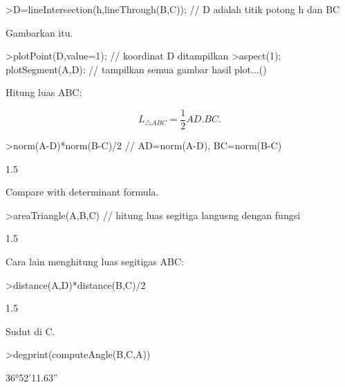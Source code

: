 \documentclass[a4paper,10pt]{article}
\begin{document}
\begin{eulernotebook}
\begin{eulercomment}
\begin{eulercomment}
\begin{eulercomment}
\begin{eulercomment}
\begin{eulercomment}
\begin{eulercomment}
\begin{eulercomment}
\begin{eulercomment}
\begin{eulercomment}
\begin{eulercomment}
\begin{eulercomment}
\begin{eulercomment}
\begin{eulercomment}
\begin{eulercomment}
\begin{eulercomment}
\begin{eulercomment}
\begin{eulercomment}
\begin{eulercomment}
\begin{eulerprompt}
>D=lineIntersection(h,lineThrough(B,C)); // D adalah titik potong h dan BC
\end{eulerprompt}
\begin{eulercomment}
Gambarkan itu.
\end{eulercomment}
\begin{eulerprompt}
>plotPoint(D,value=1); // koordinat D ditampilkan
>aspect(1); plotSegment(A,D): // tampilkan semua gambar hasil plot...()
\end{eulerprompt}
\begin{eulercomment}
Hitung luas ABC:

\end{eulercomment}
\begin{eulerformula}
\[
L_{\triangle ABC}= \frac{1}{2}AD.BC.
\]
\end{eulerformula}
\begin{eulerprompt}
>norm(A-D)*norm(B-C)/2 // AD=norm(A-D), BC=norm(B-C)
\end{eulerprompt}
\begin{euleroutput}
  1.5
\end{euleroutput}
\begin{eulercomment}
Compare with determinant formula.
\end{eulercomment}
\begin{eulerprompt}
>areaTriangle(A,B,C) // hitung luas segitiga langusng dengan fungsi
\end{eulerprompt}
\begin{euleroutput}
  1.5
\end{euleroutput}
\begin{eulercomment}
Cara lain menghitung luas segitigas ABC:
\end{eulercomment}
\begin{eulerprompt}
>distance(A,D)*distance(B,C)/2
\end{eulerprompt}
\begin{euleroutput}
  1.5
\end{euleroutput}
\begin{eulercomment}
Sudut di C.
\end{eulercomment}
\begin{eulerprompt}
>degprint(computeAngle(B,C,A))
\end{eulerprompt}
\begin{euleroutput}
  36°52'11.63''
\end{euleroutput}
\begin{eulercomment}

\end{eulercomment}
\end{eulercomment}
\end{eulercomment}
\end{eulercomment}
\end{eulercomment}
\end{eulercomment}
\end{eulercomment}
\end{eulercomment}
\end{eulercomment}
\end{eulercomment}
\end{eulercomment}
\end{eulercomment}
\end{eulercomment}
\end{eulercomment}
\end{eulercomment}
\end{eulercomment}
\end{eulercomment}
\end{eulercomment}
\end{eulercomment}
\end{eulernotebook}
\end{document}

